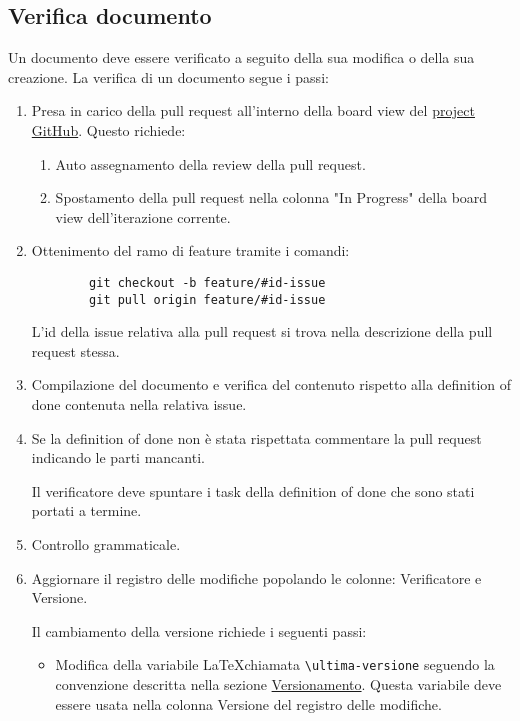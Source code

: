 \documentclass[a4paper, 12pt]{article}
\def\ultima-versione{ v0.1 }
\begin{document}
\subsection{Verifica documento}
\label{subsec:ver}
Un documento deve essere verificato a seguito della sua modifica o della sua creazione.
La verifica di un documento segue i passi:
\begin{enumerate}
    \item Presa in carico della pull request all'interno della board view del \href{https://github.com/orgs/ALT-F4-eng/projects}{project GitHub}.
    Questo richiede:
    \begin{enumerate}
        \item Auto assegnamento della review della pull request.
        \item Spostamento della pull request nella colonna "In Progress" della board view dell'iterazione corrente.
    \end{enumerate}
    
    \item Ottenimento del ramo di feature tramite i comandi:
    \begin{lstlisting}
        git checkout -b feature/#id-issue
        git pull origin feature/#id-issue
    \end{lstlisting}
    L'id della issue relativa alla pull request si trova nella descrizione della pull request stessa.

    \item Compilazione del documento e verifica del contenuto rispetto alla definition of done contenuta nella relativa issue.
    
    \item Se la definition of done non è stata rispettata commentare la pull request indicando le parti mancanti.
    
    Il verificatore deve spuntare i task della definition of done che sono stati portati a termine.
    
    \item Controllo grammaticale.
    
    \item Aggiornare il registro delle modifiche popolando le colonne: Verificatore e Versione.
    
    Il cambiamento della versione richiede i seguenti passi:
    \begin{itemize}
        \item Modifica della variabile \LaTeX \space chiamata \lstinline|\ultima-versione| seguendo la convenzione descritta nella sezione \hyperref[subsec:vers]{Versionamento}.
        Questa variabile deve essere usata nella colonna Versione del registro delle modifiche.


\end{itemize}
\end{enumerate}
\end{document}
